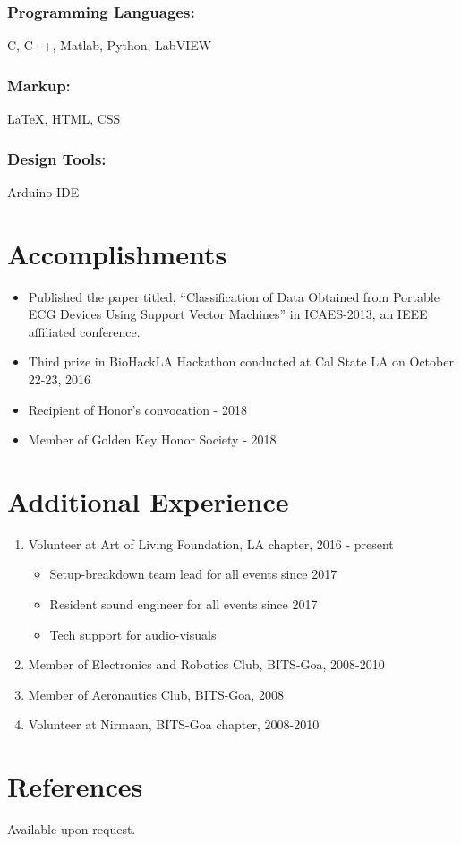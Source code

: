 \documentclass{article}
\begin{document}
\subsubsection{Programming Languages:} 
C, C++, Matlab, Python, LabVIEW
\subsubsection{Markup:} 
{\LaTeX}, HTML, CSS
\subsubsection{Design Tools:} 
Arduino IDE


\section{Accomplishments}
\begin{itemize}
    \item Published the paper titled, “Classification of Data Obtained from Portable ECG Devices Using Support Vector Machines” in ICAES-2013, an IEEE affiliated conference.
    \item Third prize in BioHackLA Hackathon conducted at Cal State LA on October 22-23, 2016
    \item Recipient of Honor's convocation - 2018
    \item Member of Golden Key Honor Society - 2018
\end{itemize}

\section{Additional Experience}
\begin{enumerate}
    \item Volunteer at Art of Living Foundation, LA chapter, 2016 - present
    \begin{itemize}
        \item Setup-breakdown team lead for all events since 2017
        \item Resident sound engineer for all events since 2017
        \item Tech support for audio-visuals
    \end{itemize}
    \item Member of Electronics and Robotics Club, BITS-Goa, 2008-2010
    \item Member of Aeronautics Club, BITS-Goa, 2008
    \item Volunteer at Nirmaan, BITS-Goa chapter, 2008-2010
\end{enumerate}


\section{References}
Available upon request.
\end{document}
